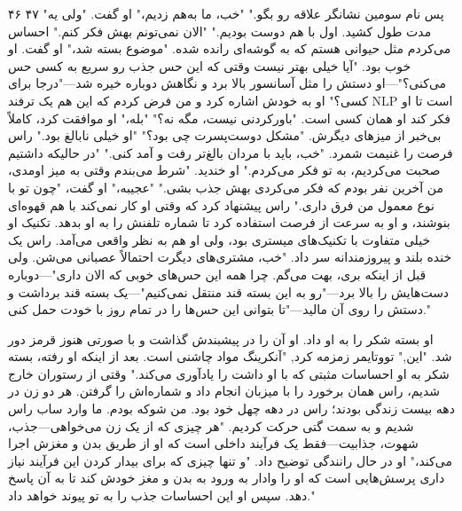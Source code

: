 ۴۶ ۴۷  
"پس نام سومین نشانگر علاقه رو بگو." "خب، ما به‌هم زدیم،" او گفت. "ولی یه مدت طول کشید. اول با هم دوست بودیم."  
"الان نمی‌تونم بهش فکر کنم." احساس می‌کردم مثل حیوانی هستم که به گوشه‌ای رانده شده.  
"موضوع بسته شد،" او گفت. او خوب بود. "آیا خیلی بهتر نیست وقتی که این حس جذب رو سریع به کسی حس می‌کنی؟"—او دستش را مثل آسانسور بالا برد و نگاهش دوباره خیره شد—"درجا برای کسی؟" او به خودش اشاره کرد و من فرض کردم که این هم یک ترفند NLP‌ است تا او فکر کند او همان کسی است. "باورکردنی نیست، مگه نه؟"  
"بله،" او موافقت کرد، کاملاً بی‌خبر از میزهای دیگرش.  
"مشکل دوست‌پسرت چی بود؟"  
"او خیلی نابالغ بود."  
راس فرصت را غنیمت شمرد. "خب، باید با مردان بالغ‌تر رفت و آمد کنی."  
"در حالیکه داشتیم صحبت می‌کردیم، به تو فکر می‌کردم." او خندید.  
"شرط می‌بندم وقتی به میز اومدی، من آخرین نفر بودم که فکر می‌کردی بهش جذب بشی."  
"عجیبه،" او گفت، "چون تو با نوع معمول من فرق داری."  
راس پیشنهاد کرد که وقتی او کار نمی‌کند با هم قهوه‌ای بنوشند، و او به سرعت از فرصت استفاده کرد تا شماره تلفنش را به او بدهد. تکنیک او خیلی متفاوت با تکنیک‌های میستری بود، ولی او هم به نظر واقعی می‌آمد.  
راس یک خنده بلند و پیروزمندانه سر داد. "خب، مشتری‌های دیگرت احتمالاً عصبانی می‌شن. ولی قبل از اینکه بری، بهت می‌گم. چرا همه این حس‌های خوبی که الان داری"—دوباره دست‌هایش را بالا برد—"رو به این بسته قند منتقل نمی‌کنیم"—یک بسته قند برداشت و دستش را روی آن مالید—"تا بتوانی این حس‌ها را در تمام روز با خودت حمل کنی."  

او بسته شکر را به او داد. او آن را در پیشبندش گذاشت و با صورتی هنوز قرمز دور شد.  
"این," تووتایمر زمزمه کرد, "آنکرینگ مواد چاشنی است. بعد از اینکه او رفته، بسته شکر به او احساسات مثبتی که با او داشت را یادآوری می‌کند."  
وقتی از رستوران خارج شدیم، راس همان برخورد را با میزبان انجام داد و شماره‌اش را گرفتن. هر دو زن در دهه بیست زندگی بودند؛ راس در دهه چهل خود بود. من شوکه بودم.  
ما وارد ساب راس شدیم و به سمت گتی حرکت کردیم. "هر چیزی که از یک زن می‌خواهی—جذب، شهوت، جذابیت—فقط یک فرآیند داخلی است که او از طریق بدن و مغزش اجرا می‌کند،" او در حال رانندگی توضیح داد. "و تنها چیزی که برای بیدار کردن این فرآیند نیاز داری پرسش‌هایی است که او را وادار به ورود به بدن و مغز خودش کند تا به آن پاسخ دهد. سپس او این احساسات جذب را به تو پیوند خواهد داد."